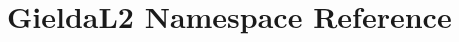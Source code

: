 \hypertarget{namespace_gielda_l2}{}\section{Gielda\+L2 Namespace Reference}
\label{namespace_gielda_l2}
